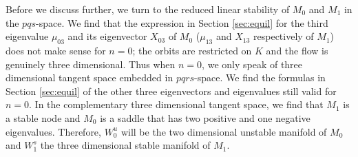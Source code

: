 \documentclass[a4paper,11pt]{article}
\newcommand{\tcr}{\textcolor{red}}
\newcommand{\tcb}{\textcolor{blue}}
\theoremstyle{remark}
\begin{document}
Before we discuss further, we turn to the reduced linear stability of $M_0$ and $M_1$ in the $pqs$-space. We find that the expression in Section \ref{sec:equil} for the third eigenvalue $\mu_{03}$ and its eigenvector $X_{03}$ of $M_0$ ($\mu_{13}$ and $X_{13}$ respectively of $M_1$) does not make sense for $n=0$; the orbits are restricted on $K$ and the flow is genuinely three dimensional. Thus when $n=0$, we only speak of three dimensional tangent space embedded in $pqrs$-space. We find the formulas in Section \ref{sec:equil} of the other three eigenvectors and eigenvalues still valid for $n=0$.  %
In the complementary three dimensional tangent space, we find that $M_1$ is a stable node and $M_0$ is a saddle that has two positive and one negative eigenvalues. Therefore, $W_0^u$ will be the two dimensional unstable manifold of $M_0$ and $W_1^s$ the three dimensional stable manifold of $M_1$.%
\end{document}
